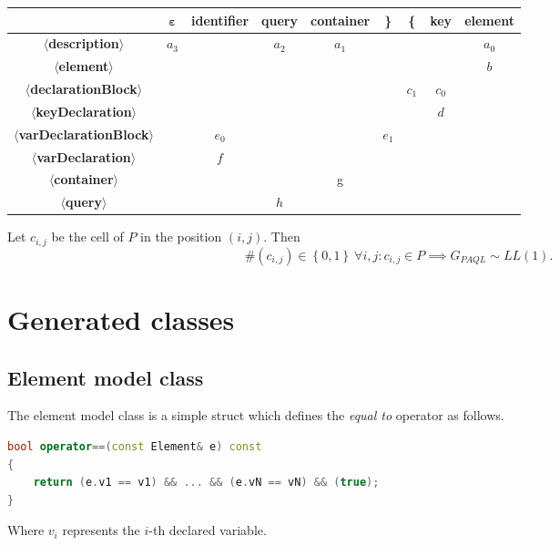 \documentclass[10pt]{article}  %
\begin{document}
    \begin{center}
    \begin{tabular}{ | c | c | c | c | c | c | c | c | c |}
        \hline
                           & $\mathbf\varepsilon$ & \textbf{identifier} & \textbf{query} & \textbf{container} & \textbf{\}} & \textbf{\{} & \textbf{key} & \textbf{element} \\
        \hline
\textbf{$\langle$description$\rangle$}& $a_3$ & & $a_2$              & $a_1$         &                &             &             & $a_0$\\
        \hline
\textbf{$\langle$element$\rangle$} & &                    &                &                    &             &             &              & $b$\\
        \hline
\textbf{$\langle$declarationBlock$\rangle$} & &                 &                &                    &            &  $c_1$       &  $c_0$    &\\
        \hline
\textbf{$\langle$keyDeclaration$\rangle$} & &               &                &                    &             &         &  $d$       &\\
        \hline
\textbf{$\langle$varDeclarationBlock$\rangle$} &  &  $e_0$               &                &                    &      $e_1$  &      &         &\\
        \hline
\textbf{$\langle$varDeclaration$\rangle$} &  &    $f$             &                &                    &             &        &         &\\
        \hline
\textbf{$\langle$container$\rangle$} & &               &                &              g      &             &         &         &\\
        \hline
\textbf{$\langle$query$\rangle$} & &                &         $h$       &                    &             &         &         &\\
        \hline
    \end{tabular}
    \end{center}
    Let $c_{i,j}$ be the cell of $P$ in the position $(i, j)$. Then
    \[
    \#(c_{i,j}) \in \left\{ 0, 1 \right\}\ \forall i,j : c_{i,j} \in P \implies G_{PAQL}\sim LL(1).
    \]
\section{Generated classes}
    \subsection{Element model class}
        The element model class is a simple struct which defines the \emph{equal to} operator as follows.
        \begin{lstlisting}[language=C++]
bool operator==(const Element& e) const
{
    return (e.v1 == v1) && ... && (e.vN == vN) && (true);
}
        \end{lstlisting}
        Where $v_i$ represents the $i$-th declared variable.
\end{document}
